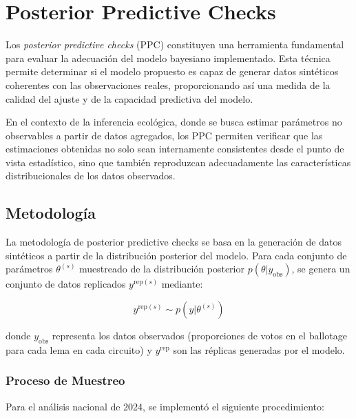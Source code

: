 \section{Posterior Predictive Checks}
\label{sec:ppc}

Los \textit{posterior predictive checks} (PPC) constituyen una herramienta fundamental para evaluar la adecuaci\'on del modelo bayesiano implementado. Esta t\'ecnica permite determinar si el modelo propuesto es capaz de generar datos sint\'eticos coherentes con las observaciones reales, proporcionando as\'i una medida de la calidad del ajuste y de la capacidad predictiva del modelo.

En el contexto de la inferencia ecol\'ogica, donde se busca estimar par\'ametros no observables a partir de datos agregados, los PPC permiten verificar que las estimaciones obtenidas no solo sean internamente consistentes desde el punto de vista estad\'istico, sino que tambi\'en reproduzcan adecuadamente las caracter\'isticas distribucionales de los datos observados.

\subsection{Metodolog\'ia}
\label{subsec:ppc_metodo}

La metodolog\'ia de posterior predictive checks se basa en la generaci\'on de datos sint\'eticos a partir de la distribuci\'on posterior del modelo. Para cada conjunto de par\'ametros $\theta^{(s)}$ muestreado de la distribuci\'on posterior $p(\theta | y_{\text{obs}})$, se genera un conjunto de datos replicados $y^{\text{rep}(s)}$ mediante:

\begin{equation}
y^{\text{rep}(s)} \sim p(y | \theta^{(s)})
\end{equation}

donde $y_{\text{obs}}$ representa los datos observados (proporciones de votos en el ballotage para cada lema en cada circuito) y $y^{\text{rep}}$ son las r\'eplicas generadas por el modelo.

\subsubsection{Proceso de Muestreo}

Para el an\'alisis nacional de 2024, se implement\'o el siguiente procedimiento:

